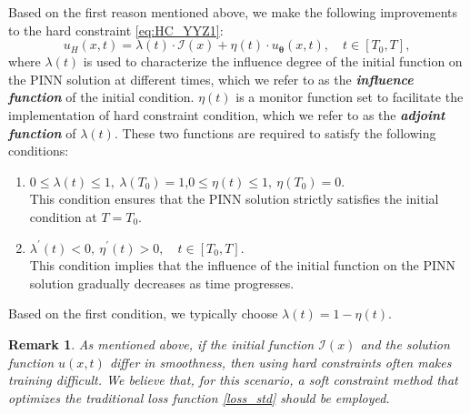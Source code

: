 \documentclass[preprint]{elsarticle}
\newtheorem{remark}{Remark}
\numberwithin{table}{section}
\numberwithin{equation}{section}
\numberwithin{figure}{section}
\begin{document}
\begin{CJK}{UTF8}{gbsn}
Based on the first reason mentioned above, we make the following improvements to the hard constraint \eqref{eq:HC_YYZ1}: 
 \begin{equation}\label{eq:HC_YYZ2}
     u_H(x,t) = \lambda(t)\cdot\mathcal{I}(x) + \eta(t)\cdot u_{\boldsymbol{\theta}}(x,t),\quad t\in [T_0,T],
\end{equation}
where $\lambda(t)$ is used to characterize the influence degree of the initial function on the PINN solution at different times, which we refer to as the \textbf{\textit{influence function}} of the initial condition. $\eta(t)$ is a monitor function set to facilitate the implementation of hard constraint condition, which we refer to as the \textbf{\textit{adjoint function}} of $\lambda(t)$. These two functions are required to satisfy the following conditions:
\begin{enumerate}
    \item 
    $ 0 \leq \lambda(t) \leq 1, ~\lambda(T_0)=1$,\quad $0 \leq \eta(t) \leq 1, ~\eta(T_0)=0.$\\
    This condition  ensures that  the PINN solution strictly satisfies the initial condition at   $T=T_0$.
     
    
    \item 
    $\lambda^{'}(t) < 0, ~\eta^{'}(t) > 0,\quad t\in[T_0, T]$.\\
    This condition implies that   the influence  of the initial function on the PINN solution gradually decreases as time progresses.
\end{enumerate}

Based on the first condition, we typically choose $\lambda(t)=1-\eta(t)$.

 

\begin{remark}\label{remark1}
As mentioned above,   if the initial function $\mathcal{I}(x)$ and the   solution function $u(x,t)$ differ in smoothness, then using hard constraints often makes training difficult. We believe that, for this scenario, a soft constraint method that optimizes the traditional loss function \eqref{loss_std} should be employed.
\end{remark}
 


\end{CJK}
\end{document}
